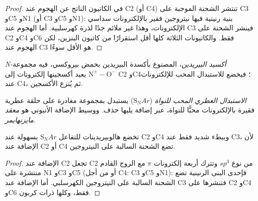 \begin{proof}
في الكاتيون الناتج عن الهجوم عند C2 (أو C4) تنتشر الشحنة الموجبة على C3 وC5
وN1 (أو C3 وC5 وN1): بنية رنينية فيها نيتروجين فقير بالإلكترونات
سداسي الإلكترونات، وهذا غير ملائم جدًا لذرة كهرسلبية. أما الهجوم
عند C3 فينشر الشحنة على C2 وC4 وC6 فقط. والكاتيونات الثلاثة كلها أقل استقرارًا
من كاتيون البنزين، لكن الهجوم عند C3 هو الأقل سوءًا.
\end{proof}

\begin{definition}\label{def:b3:heterocycles:n-oxide}
\emph{N-أكسيد البيريدين}، المصنوع بأكسدة البيريدين
بحمض بيروكسي، فيه مجموعة $\mathrm{N^+{-}O^-}$ يعيد أكسجينها إلكترونات إلى C2
وC4؛ فيخضع للاستبدال المحب للإلكترونات عند C4، ثم يُنزع
الأكسجين.
\end{definition}

\begin{definition}\label{def:b3:heterocycles:snar}
\emph{الاستبدال العطري المحب للنواة}
($\mathrm S_\mathrm NAr$) يستبدل بمجموعة مغادرة على حلقة عطرية فقيرة بالإلكترونات
محبًّا للنواة، عبر إضافة يليها حذف. ووسيط الإضافة
الأنيوني هو \emph{معقد مايزنهايمر}.
\end{definition}

\begin{proposition}\label{prop:b3:heterocycles:snar-positions}
تخضع هالوبيريدينات للتفاعل $\mathrm S_\mathrm NAr$ بسهولة عند C2 وC4 وببطء شديد فقط عند C3،
لأن الإضافة عند C2 أو C4 تضع الشحنة السالبة على النيتروجين.
\end{proposition}

\begin{proof}
الإضافة عند C2 تجعل C2 من نوع $sp^3$ وتترك أربعة إلكترونات $\pi$ مع الزوج القادم
منتشرة على N1 وC3 وC5 (أو من أجل C4: C3 وC5 وN1): فإحدى البنى الرنينية تضع
الشحنة السالبة على النيتروجين الكهرسلبي. أما الإضافة عند C3 فتنشرها على
C2 وC4 وC6 فقط، وكلها ذرات كربون.
\end{proof}

